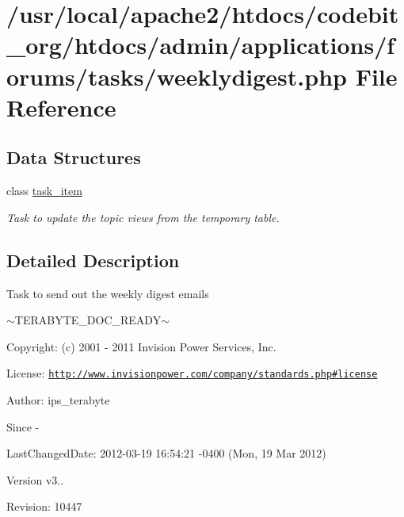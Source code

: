 \hypertarget{weeklydigest_8php}{\section{/usr/local/apache2/htdocs/codebit\-\_\-org/htdocs/admin/applications/forums/tasks/weeklydigest.php File Reference}
\label{weeklydigest_8php}
}
\subsection*{Data Structures}
\begin{DoxyCompactItemize}
\item 
class \hyperlink{classtask__item}{task\-\_\-item}
\begin{DoxyCompactList}\small\item\em Task to update the topic views from the temporary table. \end{DoxyCompactList}\end{DoxyCompactItemize}


\subsection{Detailed Description}
\begin{DoxyVerb}  Task to send out the weekly digest emails
\end{DoxyVerb}
 $\sim$\-T\-E\-R\-A\-B\-Y\-T\-E\-\_\-\-D\-O\-C\-\_\-\-R\-E\-A\-D\-Y$\sim$ \begin{DoxyParagraph}{Copyright\-:}
(c) 2001 -\/ 2011 Invision Power Services, Inc.
\end{DoxyParagraph}
\begin{DoxyParagraph}{License\-:}
\href{http://www.invisionpower.com/company/standards.php#license}{\tt http\-://www.\-invisionpower.\-com/company/standards.\-php\#license}
\end{DoxyParagraph}
\begin{DoxyParagraph}{Author\-:}
ips\-\_\-terabyte 
\end{DoxyParagraph}
\begin{DoxySince}{Since}
-\/ 
\end{DoxySince}
\begin{DoxyParagraph}{Last\-Changed\-Date\-:}
2012-\/03-\/19 16\-:54\-:21 -\/0400 (Mon, 19 Mar 2012) 
\end{DoxyParagraph}
\begin{DoxyVersion}{Version}
v3.. 
\end{DoxyVersion}
\begin{DoxyParagraph}{Revision\-:}
10447 
\end{DoxyParagraph}
